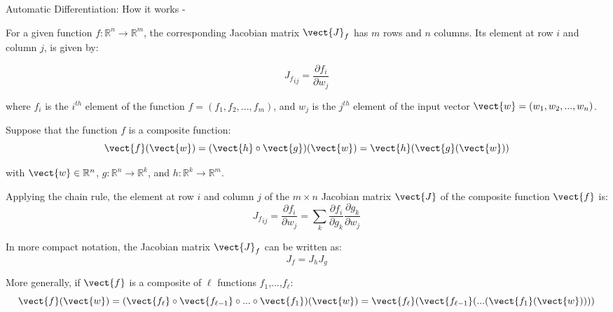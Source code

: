 \begin{frame}[t,allowframebreaks]{Automatic Differentiation: How it works -} 

  For a given function $f: \mathbb{R}^n \rightarrow \mathbb{R}^m$,
  the corresponding \gls{Jacobian matrix} 
  $\vect{J}_f$ has $m$ rows and $n$ columns.
  Its element at row $i$ and column $j$, is given by:
  
  \begin{equation}
    {J_f}_{ij} = \frac{\partial f_i}{\partial w_j}
    \label{eq:ad_jacobian_element_1}
  \end{equation}
  
  where $f_i$ is the $i^{th}$ element of the function $f=(f_1, f_2, ..., f_m)$,
  and $w_j$ is the $j^{th}$ element of the input vector $\vect{w}=(w_1, w_2, ..., w_n)$.\\
  
  \vspace{0.2cm}
  
  Suppose that the function $f$ is a composite function:
  \begin{equation}
    \vect{f}(\vect{w}) = 
      (\vect{h} \circ \vect{g}) (\vect{w})= \vect{h}(\vect{g}(\vect{w}))
    \label{eq:ad_composite_function_1}
  \end{equation}
  
  with $\vect{w} \in \mathbb{R}^n$, 
  $g: \mathbb{R}^n \rightarrow \mathbb{R}^k$, and
  $h: \mathbb{R}^k \rightarrow \mathbb{R}^m$.
  
  \framebreak
  
  Applying the chain rule, 
  the element at row $i$ and column $j$
  of the $m \times n$ \gls{Jacobian matrix} $\vect{J}$ of 
  the composite function $\vect{f}$ is:
  \begin{equation}
    {J_f}_{ij} = 
      \frac{\partial f_i}{\partial w_j} = 
      \sum_{k} \frac{\partial f_i}{\partial g_k} \frac{\partial g_k}{\partial w_j}
      \label{eq:ad_jacobian_element_composite_function_1}
  \end{equation}
  
  In more compact notation, 
  the \gls{Jacobian matrix} $\vect{J}_{f}$ can be written as:
  \begin{equation}
    J_{f} = J_{h} J_{g}
      \label{eq:ad_jacobian_composite_function_1}
  \end{equation}
  
  More generally, if $\vect{f}$ is a composite of $\ell$ functions $f_1$,...,$f_\ell$:
  \begin{equation}
    \vect{f}(\vect{w}) = 
      (\vect{f_{\ell}} \circ \vect{f_{\ell-1}} \circ ... 
        \circ \vect{f_1})(\vect{w})= \vect{f_{\ell}}(\vect{f_{\ell-1}}(...(\vect{f_1}(\vect{w}))))
    \label{eq:ad_composite_function_2}  
  \end{equation}
  

\end{frame}
